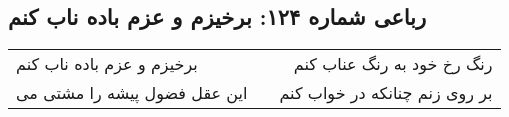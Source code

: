 \begin{center}
\section*{رباعی شماره ۱۲۴: برخیزم و عزم باده ناب کنم}
\label{sec:sh124}
\begin{longtable}{l p{0.5cm} r}
برخیزم و عزم باده ناب کنم
&&
رنگ رخ خود به رنگ عناب کنم
\\
این عقل فضول پیشه را مشتی می
&&
بر روی زنم چنانکه در خواب کنم
\\
\end{longtable}
\end{center}

